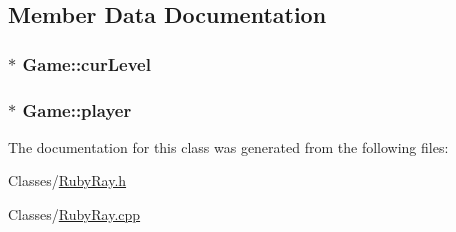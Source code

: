 \subsection{Member Data Documentation}
\hypertarget{classGame_a32a97a8e3bd409686e5a7a4a34b73b80}{
\subsubsection[{cur\-Level}]{$\ast$ Game\-::cur\-Level}}\label{classGame_a32a97a8e3bd409686e5a7a4a34b73b80}
\hypertarget{classGame_abec70aa1c0269a9a7e171af4d79e08bf}{
\subsubsection[{player}]{$\ast$ Game\-::player}}\label{classGame_abec70aa1c0269a9a7e171af4d79e08bf}


The documentation for this class was generated from the following files\-:\begin{DoxyCompactItemize}
\item 
Classes/\hyperlink{RubyRay_8h}{Ruby\-Ray.\-h}\item 
Classes/\hyperlink{RubyRay_8cpp}{Ruby\-Ray.\-cpp}\end{DoxyCompactItemize}
